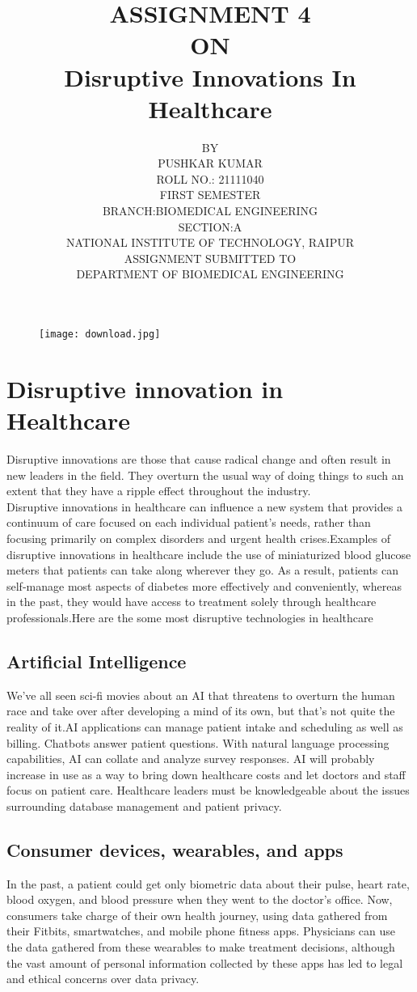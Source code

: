 \documentclass{article}
\title{ASSIGNMENT 4\\ON\\Disruptive Innovations In Healthcare​}
\author{BY\\PUSHKAR KUMAR\\ROLL NO.: 21111040\\FIRST SEMESTER\\BRANCH:BIOMEDICAL ENGINEERING\\SECTION:A\\NATIONAL INSTITUTE OF TECHNOLOGY, RAIPUR\\ASSIGNMENT SUBMITTED TO\\
DEPARTMENT OF BIOMEDICAL ENGINEERING}
\date{}
\begin{document}
\maketitle
\begin{figure}[h]
    \centering
    \texttt{[image: download.jpg]}
\end{figure}


\section{ Disruptive innovation in Healthcare}
Disruptive innovations are those that cause radical change and often result in new leaders in the field. They overturn the usual way of doing things to such an extent that they have a ripple effect throughout the industry.
\\Disruptive innovations in healthcare can influence a new system that provides a continuum of care focused on each individual patient's needs, rather than focusing primarily on complex disorders and urgent health crises.Examples of disruptive innovations in healthcare include the use of miniaturized blood glucose meters that patients can take along wherever they go. As a result, patients can self-manage most aspects of diabetes more effectively and conveniently, whereas in the past, they would have access to treatment solely through healthcare professionals.Here are the some most disruptive technologies in healthcare  
\subsection{Artificial Intelligence}
We’ve all seen sci-fi movies about an AI that threatens to overturn the human race and take over after developing a mind of its own, but that’s not quite the reality of it.AI applications can manage patient intake and scheduling as well as billing. Chatbots answer patient questions. With natural language processing capabilities, AI can collate and analyze survey responses. AI will probably increase in use as a way to bring down healthcare costs and let doctors and staff focus on patient care. Healthcare leaders must be knowledgeable about the issues surrounding database management and patient privacy. 
\subsection{Consumer devices, wearables, and apps     }
In the past, a patient could get only biometric data about their pulse, heart rate, blood oxygen, and blood pressure when they went to the doctor’s office. Now, consumers take charge of their own health journey, using data gathered from their Fitbits, smartwatches, and mobile phone fitness apps. Physicians can use the data gathered from these wearables to make treatment decisions, although the vast amount of personal information collected by these apps has led to legal and ethical concerns over data privacy.
\end{document}
